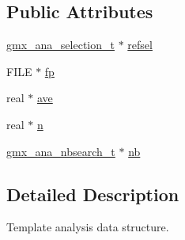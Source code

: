 \subsection*{\-Public \-Attributes}
\begin{DoxyCompactItemize}
\item 
\hyperlink{structgmx__ana__selection__t}{gmx\-\_\-ana\-\_\-selection\-\_\-t} $\ast$ \hyperlink{structt__analysisdata_afb1f31508d0f8d49e2386d3653fbdf0b}{refsel}
\item 
\-F\-I\-L\-E $\ast$ \hyperlink{structt__analysisdata_ab114cc7b33c2bae2cee4006a997d0f72}{fp}
\item 
real $\ast$ \hyperlink{structt__analysisdata_ac9b65d94013c007d7ac17a787c39de76}{ave}
\item 
real $\ast$ \hyperlink{structt__analysisdata_a875c6d6ab7ae92bcdbde52ada54e669c}{n}
\item 
\hyperlink{structgmx__ana__nbsearch__t}{gmx\-\_\-ana\-\_\-nbsearch\-\_\-t} $\ast$ \hyperlink{structt__analysisdata_a7d6814eff8dd6d3f7057451326e10e78}{nb}
\end{DoxyCompactItemize}


\subsection{\-Detailed \-Description}
\-Template analysis data structure. 

